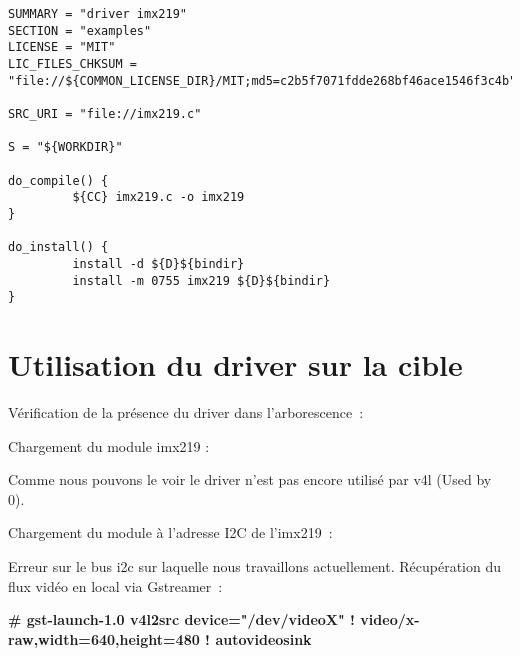 \begin{lstlisting}
SUMMARY = "driver imx219"
SECTION = "examples"
LICENSE = "MIT"
LIC_FILES_CHKSUM = "file://${COMMON_LICENSE_DIR}/MIT;md5=c2b5f7071fdde268bf46ace1546f3c4b"

SRC_URI = "file://imx219.c"

S = "${WORKDIR}"

do_compile() {
         ${CC} imx219.c -o imx219
}

do_install() {
         install -d ${D}${bindir}
         install -m 0755 imx219 ${D}${bindir}
}
\end{lstlisting}

\section{Utilisation du driver sur la cible}
Vérification de la présence du driver dans l’arborescence :


Chargement du module imx219 :


Comme nous pouvons le voir le driver n’est pas encore utilisé par v4l (Used by 0).

\clearpage

Chargement du module à l’adresse I2C de l’imx219 :


Erreur sur le bus i2c sur laquelle nous travaillons actuellement.
Récupération du flux vidéo en local via Gstreamer :

\textbf{\# gst-launch-1.0 v4l2src device="/dev/videoX" ! video/x-raw,width=640,height=480 ! autovideosink}

